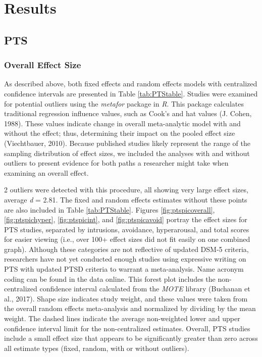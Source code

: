 \documentclass[man, mask]{apa6}
\theoremstyle{definition}
\theoremstyle{definition}
\theoremstyle{definition}
\theoremstyle{remark}
\begin{document}
\section{Results}\label{results}

\subsection{PTS}\label{pts}

\subsubsection{Overall Effect Size}\label{overall-effect-size}

As described above, both fixed effects and random effects models with
centralized confidence intervals are presented in Table
\ref{tab:PTStable}. Studies were examined for potential outliers using
the \emph{metafor} package in \emph{R}. This package calculates
traditional regression influence values, such as Cook's and hat values
(J. Cohen, 1988). These values indicate change in overall meta-analytic
model with and without the effect; thus, determining their impact on the
pooled effect size (Viechtbauer, 2010). Because published studies likely
represent the range of the sampling distribution of effect sizes, we
included the analyses with and without outliers to present evidence for
both paths a researcher might take when examining an overall effect.

2 outliers were detected with this procedure, all showing very large
effect sizes, average \emph{d} = 2.81. The fixed and random effects
estimates without these points are also included in Table
\ref{tab:PTStable}. Figures \ref{fig:ptspicoverall},
\ref{fig:ptspichyper}, \ref{fig:ptspicint}, and \ref{fig:ptspicavoid}
portray the effect sizes for PTS studies, separated by intrusions,
avoidance, hyperarousal, and total scores for easier viewing (i.e., over
100+ effect sizes did not fit easily on one combined graph). Although
these categories are not reflective of updated DSM-5 criteria,
researchers have not yet conducted enough studies using expressive
writing on PTS with updated PTSD criteria to warrant a meta-analysis.
Name acronym coding can be found in the data online. This forest plot
includes the non-centralized confidence interval calculated from the
\emph{MOTE} library (Buchanan et al., 2017). Shape size indicates study
weight, and these values were taken from the overall random effects
meta-analysis and normalized by dividing by the mean weight. The dashed
lines indicate the average non-weighted lower and upper confidence
interval limit for the non-centralized estimates. Overall, PTS studies
include a small effect size that appears to be significantly greater
than zero across all estimate types (fixed, random, with or without
outliers).
\end{document}
